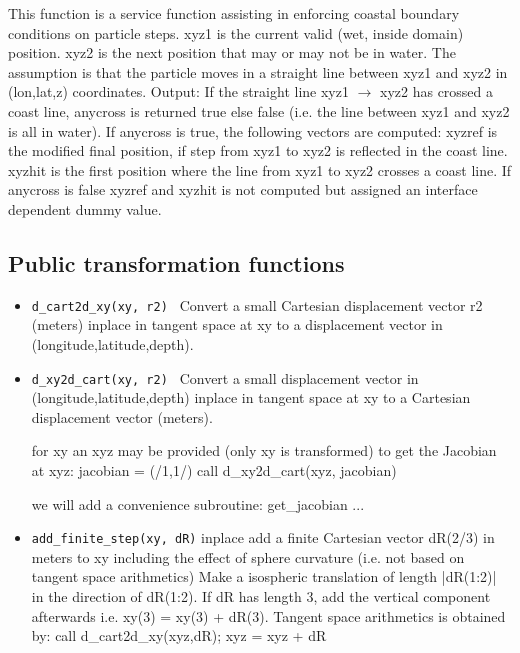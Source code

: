 \begin{itemize}
   This function is a service function assisting in enforcing 
   coastal boundary conditions on particle steps. xyz1 is the current 
   valid (wet, inside domain) position. xyz2 is the next position that may or may not be in water.
   The assumption is that the particle moves in a straight line 
   between xyz1 and xyz2 in (lon,lat,z) coordinates.\newline
   Output: If the straight line xyz1 $\rightarrow$ xyz2 has crossed a coast line, 
   anycross is returned true else false (i.e. the line between xyz1 and xyz2 is all in water). 
   If anycross is true, the following vectors are computed:
   xyzref is the modified final position, if step from xyz1 to xyz2 is reflected
   in the coast line. xyzhit is the first position where the line from xyz1 to xyz2 
   crosses a coast line. 
   If anycross is false xyzref and xyzhit is not computed but assigned an interface
   dependent dummy value.

\end{itemize}



\subsection{Public transformation functions}

\begin{itemize}

    \item {\tt d\_cart2d\_xy(xy, r2) } Convert a small Cartesian displacement vector r2 (meters)
           inplace in tangent space at xy to a displacement vector in (longitude,latitude,depth).

    \item {\tt d\_xy2d\_cart(xy, r2) } Convert a small displacement vector in (longitude,latitude,depth)
           inplace in tangent space at xy to a Cartesian displacement vector (meters).


      
for xy an xyz may be provided (only xy is transformed)
to get the Jacobian at xyz: \newline
jacobian = (/1,1/) \newline
call d\_xy2d\_cart(xyz, jacobian)\newline

we will add a convenience subroutine: get\_jacobian ...

    \item {\tt add\_finite\_step(xy, dR)} inplace add a finite
           Cartesian vector dR(2/3) in meters to xy including the 
           effect of sphere curvature (i.e. not based on tangent space arithmetics)
           Make a isospheric translation of length |dR(1:2)| in the direction
           of dR(1:2). If dR has length 3, add the vertical component afterwards
           i.e. xy(3) = xy(3) + dR(3). 
           Tangent space arithmetics is obtained by: \newline
           call d\_cart2d\_xy(xyz,dR);\newline
           xyz = xyz + dR   \newline


\end{itemize}

